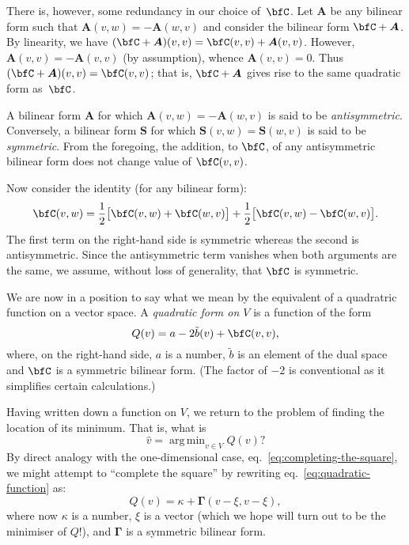 \documentclass[10pt, a4paper]{article}
\DeclareMathOperator*{\argmin}{arg\,min}
\begin{document}
There is, however, some redundancy in our choice of~$\bfC$. Let
$\bm{A}$ be any bilinear form such that $\bm{A}(v,w)=-\bm{A}(w,v)$ and
consider the bilinear form $\bfC+\bm{A}$. By linearity, we have
$(\bfC+\bm{A})(v, v) = \bfC(v,v)+\bm{A}(v,v)$. However,
$\bm{A}(v,v)=-\bm{A}(v,v)$ (by assumption), whence
$\bm{A}(v,v)=0$. Thus $(\bfC+\bm{A})(v,v)=\bfC(v,v)$; that is,
$\bfC+\bm{A}$ gives rise to the same quadratic form as~$\bfC$.

A bilinear form $\bm{A}$ for which $\bm{A}(v,w)=-\bm{A}(w,v)$ is said
to be \emph{antisymmetric}. Conversely, a bilinear form $\bm{S}$ for
which $\bm{S}(v,w)=\bm{S}(w,v)$ is said to be \emph{symmetric}. From
the foregoing, the addition, to $\bfC$, of any antisymmetric bilinear
form does not change value of $\bfC(v,v)$.


Now consider the identity (for any bilinear form):
\[
  \bfC(v, w) = \frac{1}{2}\bigl[\bfC(v,w) + \bfC(w,v)\bigr]
  + \frac{1}{2}\bigl[\bfC(v,w) - \bfC(w,v)\bigr].
\]
The first term on the right-hand side is symmetric whereas the second
is antisymmetric. Since the antisymmetric term vanishes when both
arguments are the same, we assume, without loss of generality, that
$\bfC$ is symmetric.

We are now in a position to say what we mean by the equivalent of a
quadratric function on a vector space. A \emph{quadratic form on $V$}
is a function of the form 
\begin{equation}
  Q(v) = a - 2\tilde{b}(v) + \bfC(v, v),
  \label{eq:quadratic-function}
\end{equation}
where, on the right-hand side, $a$ is a number, $\tilde{b}$ is an
element of the dual space and $\bfC$ is a symmetric bilinear
form. (The factor of $-2$ is conventional as it simplifies certain
calculations.)

Having written down a function on $V$, we return to the problem of
finding the location of its minimum. That is, what is
\[
\hat{v} = \argmin_{v\in V} Q(v)?
\]
By direct analogy with the one-dimensional case,
eq.~\eqref{eq:completing-the-square}, we might attempt to “complete
the square” by rewriting eq.~\eqref{eq:quadratic-function} as:
\begin{equation}
  Q(v) = \kappa + \bm{\Gamma}(v - \xi, v - \xi),
  \label{eq:vector-square}
\end{equation}
where now $\kappa$ is a number, $\xi$ is a vector (which we hope will turn
out to be the minimiser of $Q$!), and $\bm{\Gamma}$ is a symmetric bilinear
form.
\end{document}
